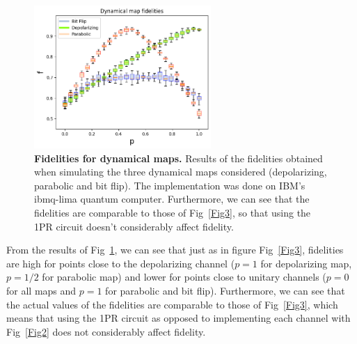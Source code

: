 \documentclass[10pt,letterpaper]{article} %
\newcommand{\fref}[1]{Fig~\ref{#1}}
\begin{document}
{\color{green}
\begin{figure} %
\centering
\includegraphics[width=0.60\textwidth]{images/dynamic-fidelitites.png}
\caption{
{\bf Fidelities for dynamical maps.} Results of the fidelities obtained when simulating the three dynamical maps considered (depolarizing, parabolic and bit flip). 
The implementation was done on IBM's ibmq-lima quantum computer.
Furthermore, we can see that the fidelities are comparable to those of \fref{Fig3}, so that using the 1PR circuit
doesn't considerably affect fidelity.}
\label{fid} 
\end{figure} %
}

From the results of \fref{fid}, we can see that just as in figure 
\fref{Fig3}, fidelities are high for points close to the depolarizing channel 
($p=1$ for depolarizing map, $p=1/2$ for parabolic map) and lower for points close
to unitary channels ($p=0$ for all maps and $p=1$ for parabolic and bit flip).
Furthermore, we can see that the actual values of the fidelities are comparable
to those of \fref{Fig3}, which means that
using the 1PR circuit as opposed to 
implementing each channel with \fref{Fig2}
does not considerably affect fidelity.
\end{document}
